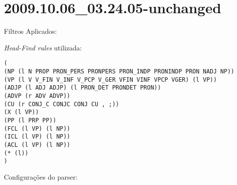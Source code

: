 \section{2009.10.06_03.24.05-unchanged} %
\label{sec:exp:2009.10.06_03.24.05-unchanged}

Filtros Aplicados:

\begin{itemize}
  
\end{itemize}

\emph{Head-Find rules} utilizada:

\scriptsize
\begin{verbatim}
(
(NP (l N PROP PRON_PERS PRONPERS PRON_INDP PRONINDP PRON NADJ NP))
(VP (l V V_FIN V_INF V_PCP V_GER VFIN VINF VPCP VGER) (l VP))
(ADJP (l ADJ ADJP) (l PRON_DET PRONDET PRON))
(ADVP (r ADV ADVP))
(CU (r CONJ_C CONJC CONJ CU , ;))
(X (l VP))
(PP (l PRP PP))
(FCL (l VP) (l NP))
(ICL (l VP) (l NP))
(ACL (l VP) (l NP))
(* (l))
)

\end{verbatim}

\normalsize

Configurações do parser:

